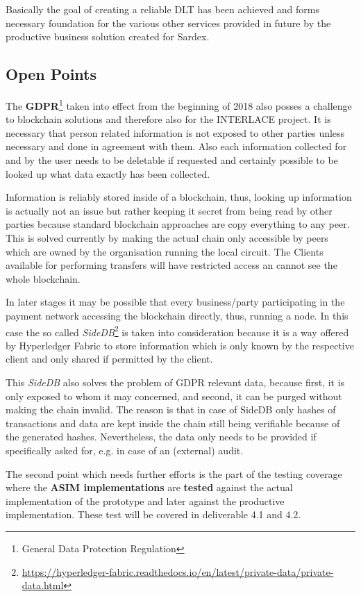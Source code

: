 Basically the goal of creating a reliable DLT has been achieved and forms necessary foundation for the various other services provided in future by the productive business solution created for Sardex.

\subsection{Open Points}

The \textbf{GDPR}\footnote{General Data Protection Regulation\cite{GDPR}} taken into effect from the beginning of 2018 also posses a challenge to blockchain solutions and therefore also for the INTERLACE project. It is necessary that person related information is not exposed to other parties unless necessary and done in agreement with them. Also each information collected for and by the user needs to be deletable if requested and certainly possible to be looked up what data exactly has been collected.

Information is reliably stored inside of a blockchain, thus, looking up information is actually not an issue but rather keeping it secret from being read by other parties because standard blockchain approaches are copy everything to any peer. This is solved currently by making the actual chain only accessible by peers which are owned by the organisation running the local circuit. The Clients available for performing transfers will have restricted access an cannot see the whole blockchain.

In later stages it may be possible that every business/party participating in the payment network accessing the blockchain directly, thus, running a node. In this case the so called \textit{SideDB}\footnote{\url{https://hyperledger-fabric.readthedocs.io/en/latest/private-data/private-data.html}} is taken into consideration because it is a way offered by Hyperledger Fabric to store information which is only known by the respective client and only shared if permitted by the client.

This \textit{SideDB} also solves the problem of GDPR relevant data, because first, it is only exposed to whom it may concerned, and second, it can be purged without making the chain invalid. The reason is that in case of SideDB only hashes of transactions and data are kept inside the chain still being verifiable because of the generated hashes. Nevertheless, the data only needs to be provided if specifically asked for, e.g. in case of an (external) audit.

The second point which needs further efforts is the part of the testing coverage where the \textbf{ASIM implementations} are \textbf{tested} against the actual implementation of the prototype and later against the productive implementation. These test will be covered in deliverable 4.1 and 4.2.